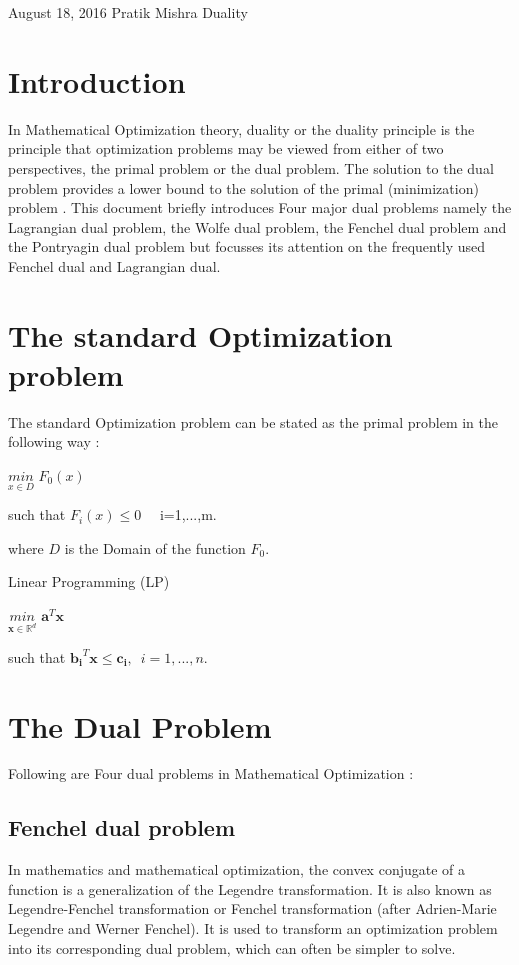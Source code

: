 \documentclass[a4paper,11pt]{article}
\begin{document}
           {August 18, 2016}      			              %
           {Pratik Mishra}                     	          %
           {Duality}  						%

\section{ Introduction}
In Mathematical Optimization theory, duality or the duality principle is the principle that optimization problems may be viewed from either of two perspectives, the primal problem or the dual problem. The solution to the dual problem provides a lower bound to the solution of the primal (minimization) problem \cite{Boyd2004}. This document briefly introduces Four major dual problems namely the Lagrangian dual problem, the Wolfe dual problem, the Fenchel dual problem and the Pontryagin dual problem but focusses its attention on the frequently used Fenchel dual and Lagrangian dual. 

\section{The standard Optimization problem}
\begin{definition}
The standard Optimization problem can be stated as the primal problem in the following way :

\centerline{$\underset{x \in D}{min}$  $ F_0(x)$}
\centerline{such that  $F_i(x) \leq 0$ \,\,\,\,  i=1,...,m.}
where $D$ is the Domain of the function $F_0$.\newline
\end{definition}

\begin{example}
Linear Programming (LP)\newline 
\centerline{\( \underset{\textbf{x} \in \mathbb{R}^d}{min}\) \(\textbf{a}^T\textbf{x}\) }
\newline
\newline
\centerline {such that ${\textbf{b}_\textbf{i}}^T\textbf{x} \leq \textbf{c}_\textbf{i}, \,\,\, i=1,...,n.$}
\end{example}


\section{The Dual Problem}
Following are Four dual problems in Mathematical Optimization :
\subsection{Fenchel dual problem}
In mathematics and mathematical optimization, the convex conjugate of a function is a generalization of the Legendre transformation. It is also known as Legendre-Fenchel transformation or Fenchel transformation (after Adrien-Marie Legendre and Werner Fenchel). It is used to transform an optimization problem into its corresponding dual problem, which can often be simpler to solve.
\end{document}
